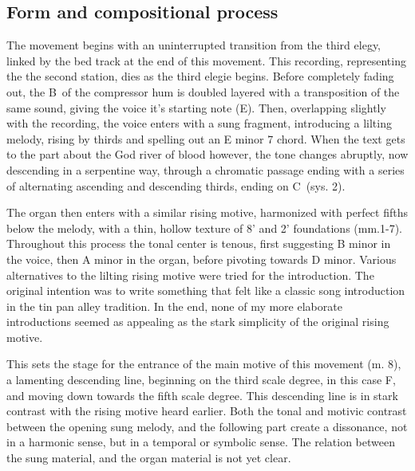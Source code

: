 \documentclass[12pt,twoside,maitrise]{dms_ks}
\theoremstyle{definition}
\begin{document}
\subsection{Form and compositional process}

The movement begins with an uninterrupted transition from the third elegy, linked by the bed track at the end of this movement. 
This recording, representing the the second station, dies as the third elegie begins. 
Before completely fading out, the B\na\ of the compressor hum is doubled layered with a transposition of the same sound, giving the voice it's starting note (E\na). 
Then, overlapping slightly with the recording, the voice enters with a sung fragment, introducing a lilting melody, rising by thirds and spelling out an E minor 7 chord. 
When the text gets to the part about the God river of blood however, the tone changes abruptly, now descending in a serpentine way, through a chromatic passage ending with a series of alternating ascending and descending thirds, ending on C\na\ (sys. 2).


The organ then enters with a similar rising motive, harmonized with perfect fifths below the melody, with a thin, hollow texture of 8' and 2' foundations (mm.1-7).
Throughout this process the tonal center is tenous, first suggesting B minor in the voice, then A minor in the organ, before pivoting towards D minor.  
Various alternatives to the lilting rising motive were tried for the introduction.  
The original intention was to write something that felt like a classic song introduction in the tin pan alley tradition.  
In the end, none of my more elaborate introductions seemed as appealing as the stark simplicity of the original rising motive.

This sets the stage for the entrance of the main motive of this movement (m. 8), a lamenting descending line, beginning on the third scale degree, in this case F, and moving down towards the fifth scale degree.  
This descending line is in stark contrast with the rising motive heard earlier.  
Both the tonal and motivic contrast between the opening sung melody, and the following part create a dissonance, not in a harmonic sense, but in a temporal or symbolic sense.  
The relation between the sung material, and the organ material is not yet clear.  
\end{document}
